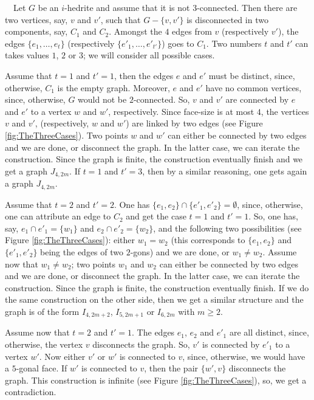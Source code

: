 \documentclass[12pt]{article}
\newcommand{\proof}{\noindent{\bf Proof.}\ \ }
\begin{document}
\proof Let $G$ be an $i$-hedrite and assume that it is not $3$-connected. 
Then there are two vertices, say, $v$ and $v'$, such that 
$G-\{v, v'\}$ is disconnected in two components, say, $C_1$ and $C_2$.
Amongst the $4$ edges from $v$ (respectively $v'$), the edges 
$\{e_1,\dots, e_{t}\}$ (respectively $\{e'_1,\dots, e'_{t'}\}$) goes
to $C_1$. Two numbers $t$ and $t'$ can takes values $1$, $2$ or $3$; we
will consider all possible cases.

Assume that $t=1$ and $t'=1$, then the edges $e$ and $e'$ must be
distinct, since, otherwise, $C_1$ is the empty graph. Moreover, $e$ and
$e'$ have no common vertices, since, otherwise, $G$ would not be $2$-connected.
So, $v$ and $v'$ are connected by $e$ and $e'$ to a vertex $w$ and $w'$,
respectively. Since face-size is at most $4$, the vertices $v$ and $v'$,
(respectively, $w$ and $w'$) are linked by two edges
(see Figure \ref{fig:TheThreeCases}).
Two points $w$ and $w'$ can either be connected by two edges and
we are done, or disconnect the graph. In the latter case, we can iterate
the construction. Since the graph is finite, the construction eventually
finish and we get a graph $J_{4,2m}$. If $t=1$ and
$t'=3$, then by a similar reasoning, one gets again a graph $J_{4,2m}$.

Assume that $t=2$ and $t'=2$. One has $\{e_1, e_2\}\cap \{e'_1, e'_2\}=\emptyset$, since, otherwise, one can attribute an edge to $C_2$ and get the case
$t=1$ and $t'=1$. So, one has, say, $e_1\cap e'_1=\{w_1\}$ and 
$e_2\cap e'_2=\{w_2\}$, and the following two possibilities 
(see Figure \ref{fig:TheThreeCases}): either $w_1=w_2$ (this
corresponds to $\{e_1, e_2\}$ and $\{e'_1, e'_2\}$ being the edges
of two $2$-gons) and we are done, or $w_1\not= w_2$.
Assume now that $w_1\not= w_2$; two points $w_1$ and $w_2$ can 
either be connected by two edges and we are done, or disconnect the
graph. In the latter case, we can iterate the construction. Since the 
graph is finite, the construction eventually finish. If we do the same
construction on the other side, then we get a similar structure and the 
graph is of the form $I_{4,2m+2}$, $I_{5, 2m+1}$ or $I_{6,2m}$ with 
$m\geq 2$.


Assume now that $t=2$ and $t'=1$. The edges $e_1$, $e_2$ and $e'_1$ are
all distinct, since, otherwise, the vertex $v$ disconnects the graph.
So, $v'$ is connected by $e'_1$ to a vertex $w'$. Now either $v'$ or $w'$
is connected to $v$, since, otherwise, we would have a $5$-gonal face.
If $w'$ is connected to $v$, then the pair $\{w', v\}$ disconnects the graph.
This construction is infinite (see Figure \ref{fig:TheThreeCases}), so,
we get a contradiction.
\end{document}
